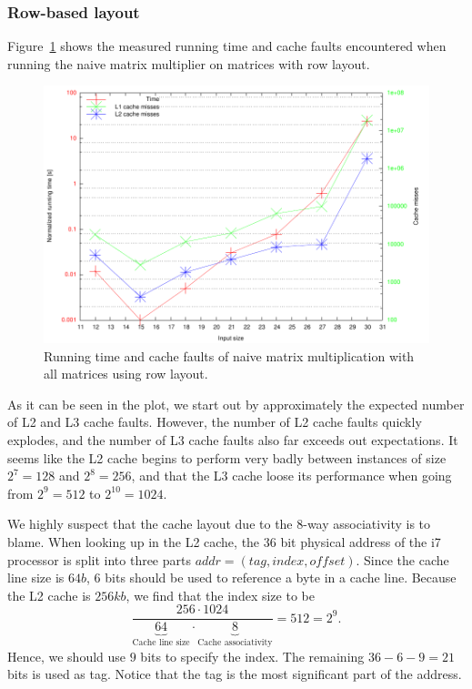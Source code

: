 \subsubsection{Row-based layout}
Figure~\ref{fig:rnrnrn0} shows the measured running time and cache
faults encountered when running the naive matrix multiplier on
matrices with row layout.
\begin{figure}[h!]
  \centering
  \includegraphics[width=\textwidth]{rnrnrn0.pdf}
  \caption{Running time and cache faults of naive matrix
    multiplication with all matrices using row layout.}
  \label{fig:rnrnrn0}
\end{figure}

As it can be seen in the plot, we start out by approximately the
expected number of L2 and L3 cache faults. However, the number of L2
cache faults quickly explodes, and the number of L3 cache faults also
far exceeds out expectations. It seems like the L2 cache begins to
perform very badly between instances of size $2^7 = 128$ and $2^8 =
256$, and that the L3 cache loose its performance when going from
$2^{9} = 512$ to $2^{10} = 1024$.

We highly suspect that the cache layout due to the 8-way associativity
is to blame. When looking up in the L2 cache, the 36 bit physical
address of the i7 processor is split into three parts $addr =
(tag,index,offset)$. Since the cache line size is $64b$, $6$ bits
should be used to reference a byte in a cache line. Because the L2
cache is $256kb$, we find that the index size to be
\[
  \frac{256 \cdot 1024}{\underbrace{64}_{\text{Cache line size}} \cdot \underbrace{8}_{\text{Cache associativity}}}
    = 512 = 2^9.
\]
Hence, we should use $9$ bits to specify the index. The remaining
$36-6-9=21$ bits is used as tag. Notice that the tag is the most
significant part of the address.


